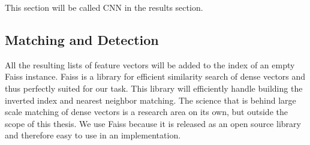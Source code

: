 \documentclass{article}
\begin{document}
This section will be called CNN in the results section.


\subsection{Matching and Detection}

All the resulting lists of feature vectors will be added to the index of an empty Faiss instance. Faiss is a library for efficient similarity search of dense vectors \cite{faiss, faiss-github} and thus perfectly suited for our task. This library will efficiently handle building the inverted index and nearest neighbor matching. The science that is behind large scale matching of dense vectors is a research area on its own, but outside the scope of this thesis. We use Faiss because it is released as an open source library and therefore easy to use in an implementation.
\end{document}
